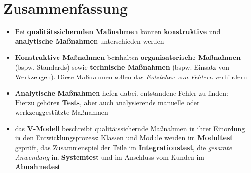 \section{Zusammenfassung}

\begin{itemize}
    \item Bei \textbf{qualitätssichernden Maßnahmen} können \textbf{konstruktive} und \textbf{analytische Maßnahmen} unterschieden werden
    \item \textbf{Konstruktive Maßnahmen} beinhalten \textbf{organisatorische Maßnahmen} (bspw. Standards)
    sowie \textbf{technische Maßnahmen} (bspw. Einsatz von Werkzeugen): Diese Maßnahmen sollen das \textit{Entstehen von Fehlern} verhindern
    \item \textbf{Analytische Maßnahmen} hefen dabei, entstandene Fehler zu finden: Hierzu gehören \textbf{Tests}, aber auch analysierende manuelle oder werkzeuggestützte Maßnahmen
    \item das \textbf{V-Modell} beschreibt qualitätssichernde Maßnahmen in ihrer Einordung in den Entwicklungsprozess: Klassen und Module werden im \textbf{Modultest} geprüft, das Zusammenspiel der Teile im \textbf{Integrationstest}, die \textit{gesamte Anwendung} im \textbf{Systemtest} und im Anschluss vom Kunden im \textbf{Abnahmetest}
\end{itemize}
